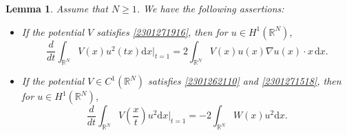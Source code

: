 \documentclass[10pt]{article}
\numberwithin{equation}{section}
\newtheorem{lemma}[theorem]{Lemma}
\newcommand{\ud}{\mathrm{d}}
\numberwithin{equation}{section}
\begin{document}
\begin{lemma}\label{2301272023}
Assume that $N\ge 1$. We have the following assertions:
\begin{itemize}
\item[$(i)$] If the potential $V$ satisfies \eqref{2301271916}, then for $u\in H^1(\mathbb{R}^N)$,
\begin{equation}\label{23012722}
\frac{d}{dt} \int_{\mathbb{R}^N} V(x)u^2(tx) \ud x\Big|_{t=1}=2\int_{\mathbb{R}^N} V(x)u(x)\nabla u(x)\cdot x \, \ud x.
\end{equation}\par
\item[$(ii)$] If the potential $V\in C^1(\mathbb{R}^N)$ satisfies \eqref{2301262110} and \eqref{2301271518}, then for $u\in H^1(\mathbb{R}^N)$,
\begin{equation}\label{2301272258}
\frac{d}{dt} \int_{\mathbb{R}^N} V\left(\frac{x}{t}\right)u^2 \ud x\Big|_{t=1}=-2\int_{\mathbb{R}^N} W(x)u^2 \ud x.
\end{equation}
\end{itemize}
\end{lemma}
\end{document}
